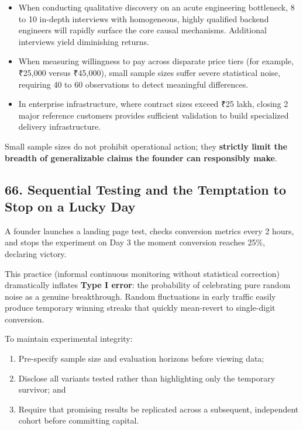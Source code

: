 \begin{itemize}
    \item When conducting qualitative discovery on an acute engineering bottleneck, 8 to 10 in-depth interviews with homogeneous, highly qualified backend engineers will rapidly surface the core causal mechanisms. Additional interviews yield diminishing returns.
    \item When measuring willingness to pay across disparate price tiers (for example, ₹25,000 versus ₹45,000), small sample sizes suffer severe statistical noise, requiring 40 to 60 observations to detect meaningful differences.
    \item In enterprise infrastructure, where contract sizes exceed ₹25 lakh, closing 2 major reference customers provides sufficient validation to build specialized delivery infrastructure.
\end{itemize}

Small sample sizes do not prohibit operational action; they \textbf{strictly limit the breadth of generalizable claims the founder can responsibly make}.

\subsection*{66. Sequential Testing and the Temptation to Stop on a Lucky Day}

A founder launches a landing page test, checks conversion metrics every 2 hours, and stops the experiment on Day 3 the moment conversion reaches 25\%, declaring victory.

This practice (informal continuous monitoring without statistical correction) dramatically inflates \textbf{Type I error}: the probability of celebrating pure random noise as a genuine breakthrough. Random fluctuations in early traffic easily produce temporary winning streaks that quickly mean-revert to single-digit conversion.

To maintain experimental integrity:
\begin{enumerate}
    \item Pre-specify sample size and evaluation horizons before viewing data;
    \item Disclose all variants tested rather than highlighting only the temporary survivor; and
    \item Require that promising results be replicated across a subsequent, independent cohort before committing capital.
\end{enumerate}

